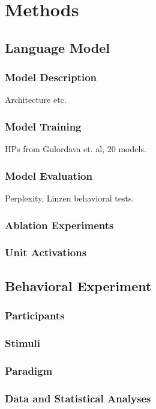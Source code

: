 \section{Methods}

\subsection{Language Model}

\subsubsection{Model Description} Architecture etc.
\subsubsection{Model Training} HPs from Gulordava et. al, 20 models. 
\subsubsection{Model Evaluation} Perplexity, Linzen behavioral tests.
\subsubsection{Ablation Experiments}
\subsubsection{Unit Activations}

\subsection{Behavioral Experiment}

\subsubsection{Participants}
\subsubsection{Stimuli}
\subsubsection{Paradigm}
\subsubsection{Data and Statistical Analyses}
